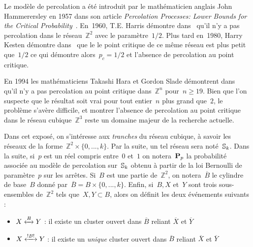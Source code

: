 \vspace*{0.3cm}
	Le modèle de percolation a été introduit par le mathématicien anglais John Hammerersley en 1957 dans son article \emph{Percolation Processes: Lower Bounds for the Critical Probability}~\cite{hammer}. En~1960, T.E. Harris démontre dans~\cite{harris} qu'il n'y a pas percolation dans le réseau~$\mathbb{Z}^2$ avec le paramètre~$1/2$. Plus tard en~1980, Harry Kesten démontre dans~\cite{kesten} que le le point critique de ce même réseau est plus petit que~$1/2$ ce qui démontre alors~$p_c=1/2$ et l'absence de percolation au point critique.
	
	En 1994 les mathématiciens Takashi Hara et Gordon Slade démontrent dans~\cite{mean} qu'il n'y a pas percolation au point critique dans~$\mathbb{Z}^n$ pour~$n\geq 19$. Bien que l'on suspecte que le résultat soit vrai pour tout entier~$n$ plus grand que~$2$, le problème s'avère difficile, et montrer l'absence de percolation au point critique dans le réseau cubique~$\mathbb{Z}^3$ reste un domaine majeur de la recherche actuelle.
	
	Dans cet exposé, on s'intéresse aux \emph{tranches} du réseau cubique, à savoir les réseaux de la forme~$\mathbb{Z}^2\times\{0,...,k\}$. Par la suite, un tel réseau sera noté~$\Sk$. \marginnote{$\Sk$}
	Dans la suite, si~$p$ est un réel compris entre~$0$ et~$1$ on notera~$\PpSP$ \marginnote{$\PpSP$} la probabilité associée au modèle de percolation sur~$\Sk$ obtenu à partir de la loi Bernoulli de paramètre~$p$ sur les arrêtes. Si~$B$ est une partie de~$\mathbb{Z}^2$, on notera~$\overline{B}$  le cylindre de base~$B$ donné par~$\overline{B}=B\times\{0,...,k\}$. 	
	Enfin, si~$B, X$ et~$Y$ sont trois sous-ensembles de~$\mathbb{Z}^2$ tels que~$X,Y\subset B$, alors on définit les deux événements suivants :
	\begin{itemize}
		\item[] $\relie[B]{X}{Y}$  : \og{} il existe un cluster ouvert dans $\overline{B}$ reliant $\overline{X}$ et $\overline{Y}$  \fg{}
		\item[] $\relie*[B]{X}{Y}$  :  \og{} il existe un \emph{unique} cluster ouvert dans $\overline{B}$ reliant $\overline{X}$ et $\overline{Y}$  \fg{}
	\end{itemize}
	
